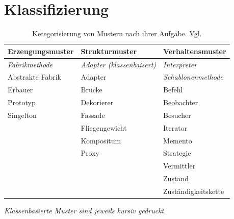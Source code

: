 \documentclass[fontsize=11pt,a4paper,final]{scrreprt}[2003/01/01]
\begin{document}
\section{Klassifizierung}\label{se:Klassifizierung}

\begin{table}[H]
	\caption{Ketegorisierung von Mustern nach ihrer Aufgabe. Vgl. \cite[S. 14]{gamma2004}}\label{ta:Klassifizierung}
	\begin{center}
		\begin{tabular}{|l|l|l|}
			\hline
			\bf Erzeugungsmuster   & \bf Strukturmuster                & \bf Verhaltensmuster       \\
			\hline
			\textit{Fabrikmethode} & \textit{Adapter (klassenbaisert)} & \textit{Interpreter}       \\
			Abstrakte Fabrik       & Adapter                           & \textit{Schablonenmethode} \\
			Erbauer                & Brücke                           & Befehl                     \\
			Prototyp               & Dekorierer                        & Beobachter                 \\
			Singelton              & Fassade                           & Besucher                   \\
			                       & Fliegengewicht                    & Iterator                   \\
			                       & Kompositum                        & Memento                    \\
			                       & Proxy                             & Strategie                  \\
			                       &                                   & Vermittler                 \\
			                       &                                   & Zustand                    \\
			                       &                                   & Zuständigkeitskette       \\
			\hline
		\end{tabular}
	\end{center}
	\begin{center}
		\small{\textit{Klassenbasierte Muster sind jeweils kursiv gedruckt.}}
	\end{center}
\end{table}
\end{document}

